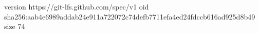 version https://git-lfs.github.com/spec/v1
oid sha256:aab4e6989addab24e911a722072c74defb7711efa4ed24fdccb616ad925d8b49
size 74
